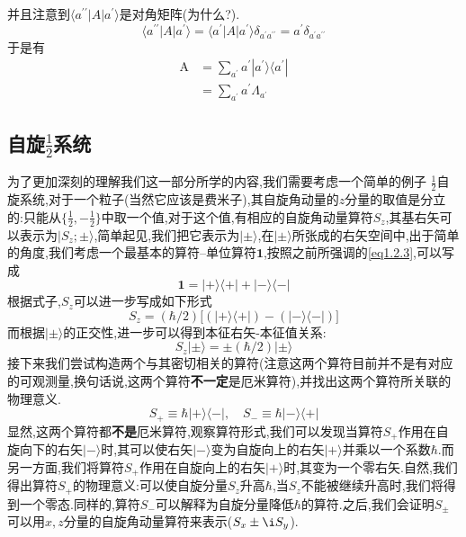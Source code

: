 并且注意到$\langle a^{\prime\prime}| A| a^{\prime}\rangle $是对角矩阵(为什么?).
\begin{equation}
	\langle a^{\prime\prime}|A|a^{\prime}\rangle=\langle a^{\prime}|A|a^{\prime}\rangle\delta_{a^{\prime}a^{\prime\prime}}=a^{\prime}\delta_{a^{\prime}a^{\prime\prime}}
\end{equation}
于是有
\begin{equation}\label{eq1.2.4}
	\begin{aligned}\text{A}&= \sum_{a^{\prime}}a^{\prime}| a^{\prime}\rangle\langle a^{\prime}|\\&= \sum_{a^{\prime}}a^{\prime}\Lambda_{a^{\prime}}\end{aligned}
\end{equation}
\subsection{自旋$\frac12$系统}
为了更加深刻的理解我们这一部分所学的内容,我们需要考虑一个简单的例子  $\frac12$自旋系统,对于一个粒子(当然它应该是费米子),其自旋角动量的$z$分量的取值是分立的:只能从$\{\frac12,-\frac12\}$中取一个值,对于这个值,有相应的自旋角动量算符$S_z$,其基右矢可以表示为$| S_{z};\pm\rangle $,简单起见,我们把它表示为$|\pm\rangle $,在$|\pm\rangle $所张成的右矢空间中,出于简单的角度,我们考虑一个最基本的算符--单位算符$\mathbf{1}$,按照之前所强调的\ref{eq1.2.3},可以写成
\begin{equation}
	\mathbf{1}=|+\rangle\langle+|+|-\rangle\langle-|
\end{equation}
根据式子\label{1.2.4},$S_z$可以进一步写成如下形式
\begin{equation}
	S_{z}=(\hbar/2)\Big[(|+\rangle\langle+|)-(|-\rangle\langle-|)\Big]
\end{equation}
而根据$|\pm\rangle$的正交性,进一步可以得到本征右矢-本征值关系:
\begin{equation}
	S_{z}|\pm\rangle=\pm(\hbar/2)|\pm\rangle 
\end{equation}
接下来我们尝试构造两个与其密切相关的算符(注意这两个算符目前并不是有对应的可观测量,换句话说,这两个算符\textbf{不一定}是厄米算符),并找出这两个算符所关联的物理意义.
\begin{equation}
	S_+\equiv\hbar|+\rangle\langle-| ,\quad S_-\equiv\hbar|-\rangle\langle+|
\end{equation}
显然,这两个算符都\textbf{不是}厄米算符,观察算符形式,我们可以发现当算符$S_+$作用在自旋向下的右矢$|-\rangle$时,其可以使右矢$|-\rangle$变为自旋向上的右矢$|+\rangle$并乘以一个系数$\hbar$.而另一方面,我们将算符$S_+$作用在自旋向上的右矢$|+\rangle$时,其变为一个零右矢.自然,我们得出算符$S_+$的物理意义:可以使自旋分量$S_z$升高$\hbar$,当$S_z$不能被继续升高时,我们将得到一个零态.同样的,算符$S_-$可以解释为自旋分量降低$\hbar$的算符.之后,我们会证明$S_\pm$可以用$x,z$分量的自旋角动量算符来表示($S_x\pm\i S_y$).

